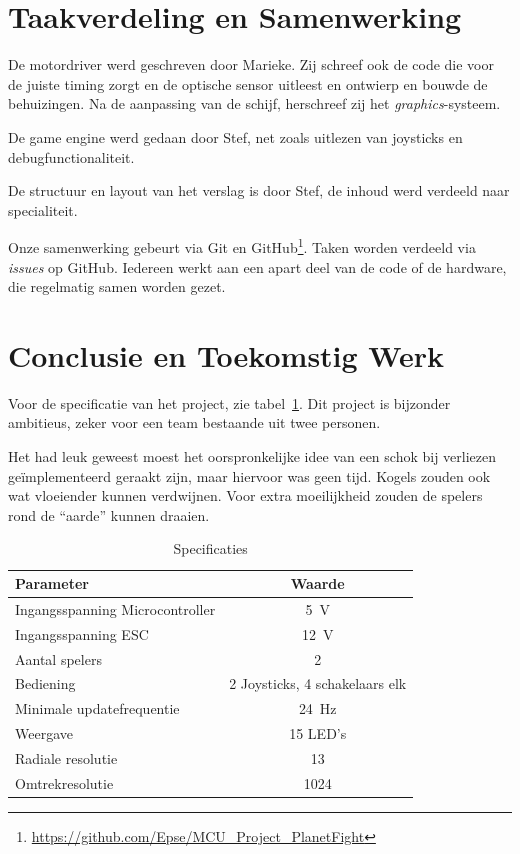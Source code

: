 \documentclass[12pt]{ugentreport}
\begin{document}
\section{Taakverdeling en Samenwerking}
De motordriver werd geschreven door Marieke. Zij schreef ook de code die voor de
juiste timing zorgt en de optische sensor uitleest en ontwierp en bouwde de
behuizingen. Na de aanpassing van de schijf, herschreef zij het \emph{graphics}-systeem.

De game engine werd gedaan door Stef,
net zoals uitlezen van joysticks en debugfunctionaliteit.

De structuur en layout van het verslag is door Stef, de inhoud werd verdeeld
naar specialiteit.

Onze samenwerking gebeurt via Git en
GitHub\footnote{\url{https://github.com/Epse/MCU_Project_PlanetFight}}. Taken worden
verdeeld via \emph{issues} op GitHub. Iedereen werkt aan een apart deel van de
code of de hardware, die regelmatig samen worden gezet.

\section{Conclusie en Toekomstig Werk}
Voor de specificatie van het project, zie tabel~\ref{tbl:specs}.
Dit project is bijzonder ambitieus, zeker voor een team bestaande uit twee
personen.

Het had leuk geweest moest het oorspronkelijke idee van een schok bij verliezen
geïmplementeerd geraakt zijn, maar hiervoor was geen tijd. Kogels zouden ook wat
vloeiender kunnen verdwijnen. Voor extra moeilijkheid zouden de spelers rond  de
``aarde'' kunnen draaien.

\begin{table}
  \centering
  \begin{tabular}{l|c}
    \hline
    Parameter & Waarde\\
    \hline
    Ingangsspanning Microcontroller & \SI{5}{\volt}\\
    Ingangsspanning ESC & \SI{12}{\volt}\\
    Aantal spelers & 2\\
    Bediening & 2 Joysticks, 4 schakelaars elk\\
    Minimale updatefrequentie & \SI{24}{\hertz}\\
    Weergave & 15 LED's\\
    Radiale resolutie & 13\\
    Omtrekresolutie & 1024\\
    \hline
  \end{tabular}
  \caption{Specificaties}
  \label{tbl:specs}
\end{table}
\end{document}
